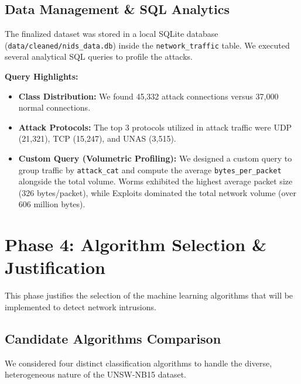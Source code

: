 \documentclass[12pt, a4paper]{article}
\begin{document}
\subsection{Data Management \& SQL Analytics}
The finalized dataset was stored in a local SQLite database (\texttt{data/cleaned/nids\_data.db}) inside the \texttt{network\_traffic} table. We executed several analytical SQL queries to profile the attacks. 

\textbf{Query Highlights:}
\begin{itemize}
    \item \textbf{Class Distribution:} We found 45,332 attack connections versus 37,000 normal connections.
    \item \textbf{Attack Protocols:} The top 3 protocols utilized in attack traffic were UDP (21,321), TCP (15,247), and UNAS (3,515).
    \item \textbf{Custom Query (Volumetric Profiling):} We designed a custom query to group traffic by \texttt{attack\_cat} and compute the average \texttt{bytes\_per\_packet} alongside the total volume. Worms exhibited the highest average packet size (326 bytes/packet), while Exploits dominated the total network volume (over 606 million bytes).
\end{itemize}
\section{Phase 4: Algorithm Selection \& Justification}

This phase justifies the selection of the machine learning algorithms that will be implemented to detect network intrusions.

\subsection{Candidate Algorithms Comparison}
We considered four distinct classification algorithms to handle the diverse, heterogeneous nature of the UNSW-NB15 dataset.
\end{document}
